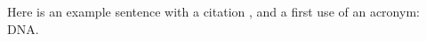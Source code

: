 Here is an example sentence with a citation \cite{Example2025}, and a
first use of an acronym: \ac{DNA}.
\blindtext
